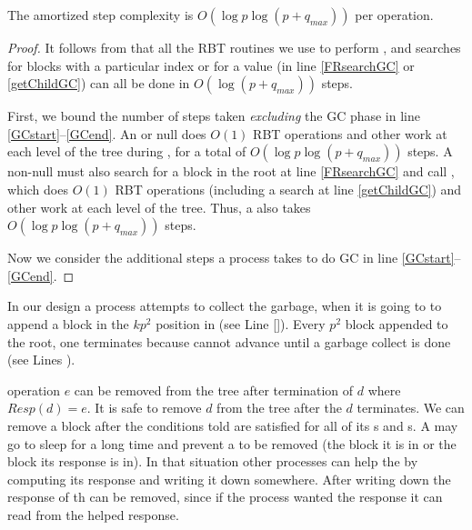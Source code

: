 \begin{proposition}
The amortized step complexity is $O(\log p \log(p+q_{max}))$ per operation.
\end{proposition}
\begin{proof}
It follows from 
that all the RBT routines we use to perform ,  and searches for
blocks with a particular index or for a  value (in line \ref{FRsearchGC} or \ref{getChildGC}) can all be done in $O(\log(p+q_{max}))$ steps.

First, we bound the number of steps taken \emph{excluding} the GC phase in line \ref{GCstart}--\ref{GCend}.
An  or null  does $O(1)$ RBT operations and other work at each level of the tree during ,
for a total of $O(\log p \log(p+q_{max}))$ steps.
A non-null  must also search for a block in the root at line \ref{FRsearchGC}
and call , which does $O(1)$ RBT operations (including a search at line \ref{getChildGC}) and other work at each level of the tree.
Thus, a  also takes $O(\log p \log(p+q_{max}))$ steps.

Now we consider the additional steps a process takes to do GC in line \ref{GCstart}--\ref{GCend}.

\end{proof}




In our design a process attempts to collect the garbage, when it is going to to append a block in the $kp^2$ position in  (see Line \ref{}). Every $p^2$  block appended to the root, one  terminates because  cannot advance until a  garbage collect is done (see Lines ).

%

 operation $e$ can be removed from the tree after termination of  $d$ where $Resp(d)=e$. It is safe to remove  $d$ from the tree after the $d$ terminates. We can remove a block after the conditions told are satisfied for all of its s and s. A  may go to sleep for a long time and prevent a  to be removed (the block it is in or the block its response is in). In that situation other processes can help the  by computing its response and writing it down somewhere. After writing down the response of th  can be removed, since if the process wanted the response it can read from the helped response.

